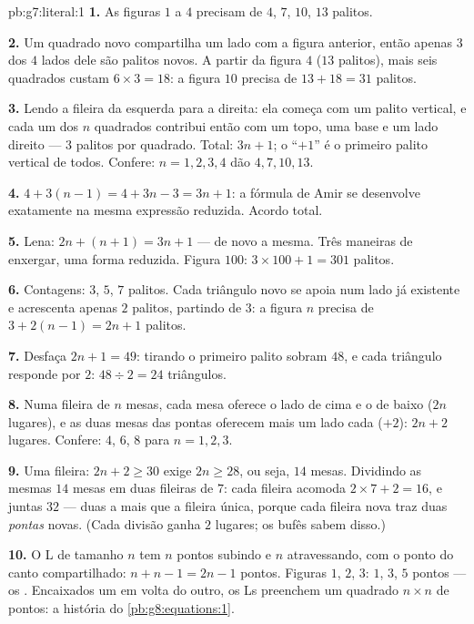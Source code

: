 \begin{solution}{pb:g7:literal:1}
\textbf{1.} As figuras $1$ a $4$ precisam de $4$, $7$, $10$, $13$
palitos.

\textbf{2.} Um quadrado novo compartilha um lado com a figura anterior,
então apenas $3$ dos $4$ lados dele são palitos novos. A partir da
figura $4$ ($13$ palitos), mais seis quadrados custam
$6 \times 3 = 18$: a figura $10$ precisa de $13 + 18 = 31$ palitos.

\textbf{3.} Lendo a fileira da esquerda para a direita: ela começa com
um palito vertical, e cada um dos $n$ quadrados contribui então com um
topo, uma base e um lado direito --- $3$ palitos por quadrado. Total:
$3n + 1$; o ``$+1$'' é o primeiro palito vertical de todos. Confere:
$n = 1, 2, 3, 4$ dão $4, 7, 10, 13$.

\textbf{4.} $4 + 3(n - 1) = 4 + 3n - 3 = 3n + 1$: a fórmula de Amir se
desenvolve exatamente na mesma expressão reduzida. Acordo total.

\textbf{5.} Lena: $2n + (n + 1) = 3n + 1$ --- de novo a mesma. Três
maneiras de enxergar, uma forma reduzida. Figura $100$:
$3 \times 100 + 1 = 301$ palitos.

\textbf{6.} Contagens: $3$, $5$, $7$ palitos. Cada triângulo novo se
apoia num lado já existente e acrescenta apenas $2$ palitos, partindo
de $3$: a figura $n$ precisa de $3 + 2(n - 1) = 2n + 1$ palitos.

\textbf{7.} Desfaça $2n + 1 = 49$: tirando o primeiro palito sobram
$48$, e cada triângulo responde por $2$: $48 \div 2 = 24$ triângulos.

\textbf{8.} Numa fileira de $n$ mesas, cada mesa oferece o lado de cima
e o de baixo ($2n$ lugares), e as duas mesas das pontas oferecem mais
um lado cada ($+2$): $2n + 2$ lugares. Confere: $4$, $6$, $8$ para
$n = 1, 2, 3$.

\textbf{9.} Uma fileira: $2n + 2 \geq 30$ exige $2n \geq 28$, ou seja,
$14$ mesas. Dividindo as mesmas $14$ mesas em duas fileiras de $7$:
cada fileira acomoda $2 \times 7 + 2 = 16$, e juntas $32$ --- duas a
mais que a fileira única, porque cada fileira nova traz duas
\emph{pontas} novas. (Cada divisão ganha $2$ lugares; os bufês sabem
disso.)

\textbf{10.} O L de tamanho $n$ tem $n$ pontos subindo e $n$
atravessando, com o ponto do canto compartilhado: $n + n - 1 = 2n - 1$
pontos. Figuras $1$, $2$, $3$: $1$, $3$, $5$ pontos --- os
\emph{}. Encaixados um em volta do outro, os Ls
preenchem um quadrado $n \times n$ de pontos: a história do
\cref{pb:g8:equations:1}.


\end{solution}
